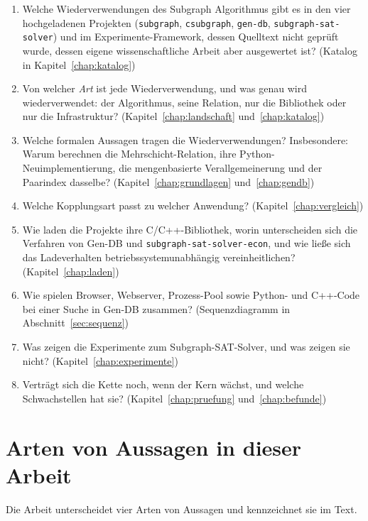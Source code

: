 \documentclass[a4paper,12pt,twoside]{report}
\DeclareRobustCommand{\_}{\textunderscore\allowbreak{}}
\theoremstyle{definition}
\begin{document}
\begin{enumerate}
	\item Welche Wiederverwendungen des Subgraph Algorithmus gibt es in den vier hochgeladenen Projekten (\texttt{subgraph}, \texttt{csubgraph}, \texttt{gen-db}, \texttt{subgraph-sat-solver}) und im Experimente-Framework, dessen Quelltext nicht geprüft wurde, dessen eigene wissenschaftliche Arbeit aber ausgewertet ist? (Katalog in Kapitel~\ref{chap:katalog})
	\item Von welcher \emph{Art} ist jede Wiederverwendung, und was genau wird wiederverwendet: der Algorithmus, seine Relation, nur die Bibliothek oder nur die Infrastruktur? (Kapitel~\ref{chap:landschaft} und~\ref{chap:katalog})
	\item Welche formalen Aussagen tragen die Wiederverwendungen? Insbesondere: Warum berechnen die Mehrschicht-Relation, ihre Python-Neuimplementierung, die mengenbasierte Verallgemeinerung und der Paarindex dasselbe? (Kapitel~\ref{chap:grundlagen} und~\ref{chap:gendb})
	\item Welche Kopplungsart passt zu welcher Anwendung? (Kapitel~\ref{chap:vergleich})
	\item Wie laden die Projekte ihre C/C++-Bibliothek, worin unterscheiden sich die Verfahren von Gen-DB und \texttt{subgraph-sat-solver-econ}, und wie ließe sich das Ladeverhalten betriebssystemunabhängig vereinheitlichen? (Kapitel~\ref{chap:laden})
	\item Wie spielen Browser, Webserver, Prozess-Pool sowie Python- und C++-Code bei einer Suche in Gen-DB zusammen? (Sequenzdiagramm in Abschnitt~\ref{sec:sequenz})
	\item Was zeigen die Experimente zum Subgraph-SAT-Solver, und was zeigen sie nicht? (Kapitel~\ref{chap:experimente})
	\item Verträgt sich die Kette noch, wenn der Kern wächst, und welche Schwachstellen hat sie? (Kapitel~\ref{chap:pruefung} und~\ref{chap:befunde})
\end{enumerate}
 
\section{Arten von Aussagen in dieser Arbeit}
\label{sec:einleitung_aussagen}
 
Die Arbeit unterscheidet vier Arten von Aussagen und kennzeichnet sie im Text.
 
\end{document}

